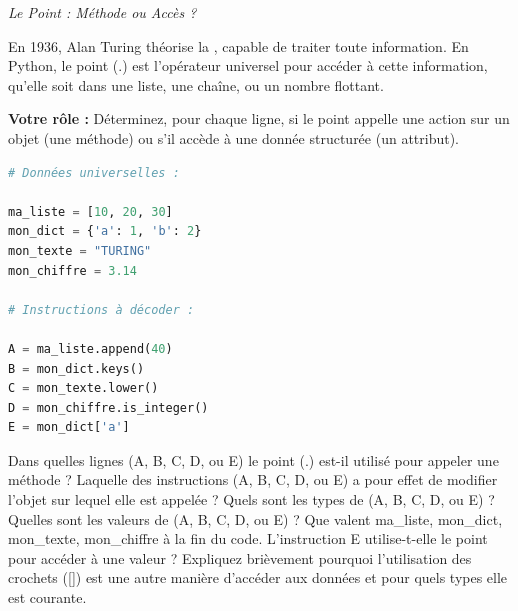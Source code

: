 \newpage
\begin{Exercise}[title=Décoder les Données Universelles d'Alan Turing (1936)]

\begin{center}
\textit{Le Point : Méthode ou Accès ?}
\end{center}

En 1936, Alan Turing théorise la , capable de traiter toute information. En Python, le point (.) est l'opérateur universel pour accéder à cette information, qu'elle soit dans une liste, une chaîne, ou un nombre flottant.

\textbf{Votre rôle :} Déterminez, pour chaque ligne, si le point appelle une action sur un objet (une méthode) ou s'il accède à une donnée structurée (un attribut).

\begin{lstlisting}[language=Python]
# Données universelles :

ma_liste = [10, 20, 30]
mon_dict = {'a': 1, 'b': 2}
mon_texte = "TURING"
mon_chiffre = 3.14

# Instructions à décoder :

A = ma_liste.append(40)
B = mon_dict.keys()
C = mon_texte.lower()
D = mon_chiffre.is_integer()
E = mon_dict['a']
\end{lstlisting}

\Question Dans quelles lignes (A, B, C, D, ou E) le point (.) est-il utilisé pour appeler une méthode ?
\Question Laquelle des instructions (A, B, C, D, ou E) a pour effet de modifier l'objet sur lequel elle est appelée ?
\Question Quels sont les types de (A, B, C, D, ou E) ?
\Question Quelles sont les valeurs de (A, B, C, D, ou E) ?
\Question Que valent ma\_liste, mon\_dict, mon\_texte, mon\_chiffre à la fin du code.
\Question L'instruction E utilise-t-elle le point pour accéder à une valeur ? Expliquez brièvement pourquoi l'utilisation des crochets ([]) est une autre manière d'accéder aux données et pour quels types elle est courante.
\end{Exercise}

\newpage


